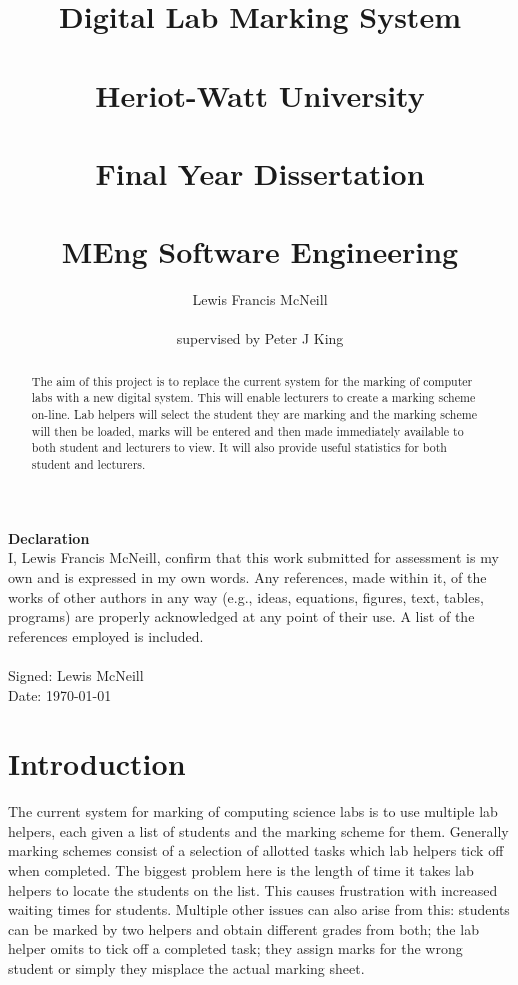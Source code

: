 \documentclass[11pt]{report}
\title{Digital Lab Marking System \\~\\  \large{Heriot-Watt University} \\~\\Final Year Dissertation \\~\\ MEng Software Engineering}
\author{Lewis Francis McNeill\\~\\
supervised by
Peter J King}
\begin{document}
\maketitle
{}




\newpage
\setcounter{page}{1}
\doublespacing
\textbf{\Large{Declaration}} \\[2em]
I, Lewis Francis McNeill, confirm that this work submitted for assessment is my own and is expressed in my own words. Any references, made within it, of the works of other authors in any way (e.g., ideas, equations, figures, text, tables, programs) are properly acknowledged at any point of their use. A list of the references employed is included.
\\
\\
Signed: Lewis McNeill
\\
Date: \today


\newpage               
\begin{abstract}
\noindent

The aim of this project is to replace the current system for the marking of computer labs with a new digital system. This will enable lecturers to create a marking scheme on-line. Lab helpers will select the student they are marking and the marking scheme will then be loaded, marks will be entered and then made immediately available to both student and lecturers to view. It will also provide useful statistics for both student and lecturers.
\end{abstract}
\newpage 

\tableofcontents
\newpage
\listoffigures
\newpage
\listoftables
\lstlistoflistings


\newpage   
\setcounter{page}{1}
\chapter{Introduction}

The current system for marking of computing science labs is to use multiple lab helpers, each given a list of students and the marking scheme for them. Generally marking schemes consist of a selection of allotted  tasks which lab helpers tick off when completed. The biggest problem here  is the length of time it takes lab helpers to locate the students on the list. This causes frustration with increased waiting times for students.  Multiple other issues  can also  arise from this: students can be marked by two helpers and obtain different grades from both; the lab helper omits to  tick off a completed task; they assign  marks for the wrong student or simply they misplace the actual marking sheet.
\end{document}
